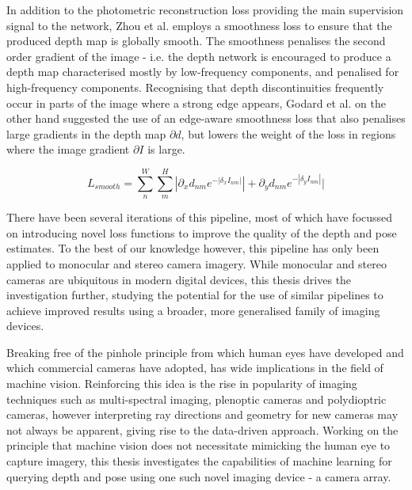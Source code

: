 In addition to the photometric reconstruction loss providing the main supervision signal to the network, Zhou et al. \cite{zhou2017unsupervised} employs a smoothness loss to ensure that the produced depth map is globally smooth. The smoothness penalises the second order gradient of the image - i.e. the depth network is encouraged to produce a depth map characterised mostly by low-frequency components, and penalised for high-frequency components. Recognising that depth discontinuities frequently occur in parts of the image where a strong edge appears, Godard et al. \cite{godard2016consistency} on the other hand suggested the use of an edge-aware smoothness loss that also penalises large gradients in the depth map $\partial{d}$, but lowers the weight of the loss in regions where the image gradient $\partial{I}$ is large. 

\begin{equation}
    L_{smooth} =  \sum_n^W \sum_m^H |\partial_x d_{nm} e^{-|\delta_x I_{nm}|}| + \partial_y d_{nm} e^{-|\delta_y I_{nm}|}|
\end{equation}

There have been several iterations \cite{bian2019consistency, godard2016consistency, godard2018selfsupervised, zhan2018deepfeature} of this pipeline, most of which have focussed on introducing novel loss functions to improve the quality of the depth and pose estimates. To the best of our knowledge however, this pipeline has only been applied to monocular and stereo camera imagery. While monocular and stereo cameras are ubiquitous in modern digital devices, this thesis drives the investigation further, studying the potential for the use of similar pipelines to achieve improved results using a broader, more generalised family of imaging devices. 

Breaking free of the pinhole principle from which human eyes have developed and which commercial cameras have adopted, has wide implications in the field of machine vision. Reinforcing this idea is the rise in popularity of imaging techniques such as multi-spectral imaging, plenoptic cameras and polydioptric cameras, however interpreting ray directions and geometry for new cameras may not always be apparent, giving rise to the data-driven approach. Working on the principle that machine vision does not necessitate mimicking the human eye to capture imagery, this thesis investigates the capabilities of machine learning for querying depth and pose using one such novel imaging device - a camera array.



